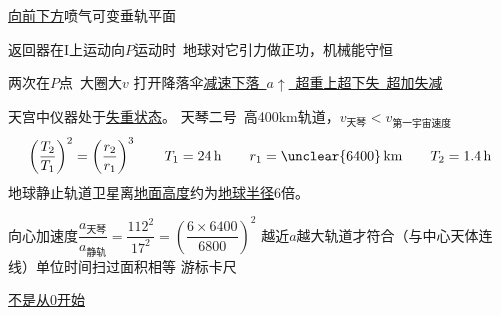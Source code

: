 \underline{向前下方}喷气可变垂轨\quad {}平面 %

返回器在I上运动向$P$运动时\ 地球对它引力做正功，机械能守恒

两次在$P$点\ 大圈大$v$
打开降落伞\underline{减速下落\ $a\uparrow$\ 超重}\qquad \underline{上超下失\ 超加失减}

天宫中仪器处于\underline{失重状态}。
天琴二号\ 高400$\mathrm{km}$轨道，\underline{$v_{\text{天琴}}<v_{\text{第一宇宙速度}}$}
\[
\left(\frac{T_2}{T_1}\right)^2=\left(\frac{r_2}{r_1}\right)^3\qquad T_1=24\,\mathrm{h}\qquad r_1=\unclear{6400}\,\mathrm{km}\qquad T_2=1.4\,\mathrm{h}
\]
地球静止轨道卫星离\underline{地面高度}约为\underline{地球半径}6倍。

向心加速度\quad $\dfrac{a_{\text{天琴}}}{a_{\text{静轨}}}=\dfrac{112^2}{17^2}=\left(\dfrac{6\times6400}{6800}\right)^2$ %
越近$a$越大\quad {}轨道才符合（与中心天体连线）单位时间扫过面积相等 %
游标卡尺

\underline{不是从0开始}
